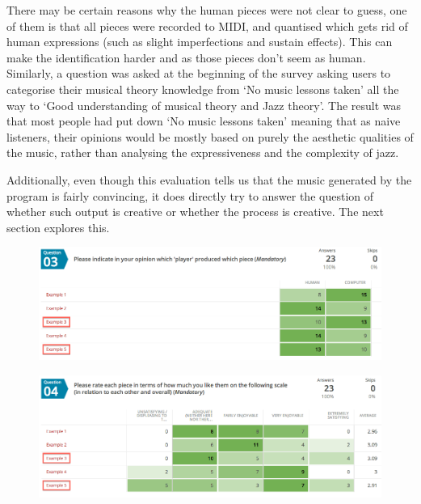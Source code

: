 \documentclass[pdftex,12pt,a4paper]{report}
\begin{document}
There may be certain reasons why the human pieces were not clear to guess, one of them is that all pieces were recorded to MIDI, and quantised which gets rid of human expressions (such as slight imperfections and  sustain effects). This can make the identification harder and as those pieces don't seem as human. Similarly, a question was asked at the beginning of the survey asking users to categorise their musical theory knowledge from `No music lessons taken' all the way to `Good understanding of musical theory and Jazz theory'. The result was that most people had put down `No music lessons taken' meaning that as naive listeners, their opinions would be mostly based on purely the aesthetic qualities of the music, rather than analysing the expressiveness and the complexity of jazz.

Additionally, even though this evaluation tells us that the music generated by the program is fairly convincing, it does directly try to answer the question of whether such output is creative or whether the process is creative. The next section explores this.


\begin{figure}[here]
  \centering
  \includegraphics[scale=0.40]{figure/identification.png}
  \label{fig:identification}
\end{figure}

\begin{figure}[here]
  \centering
  \includegraphics[scale=0.40]{figure/opinion.png}
  \label{fig:opinion}
\end{figure}
\end{document}
